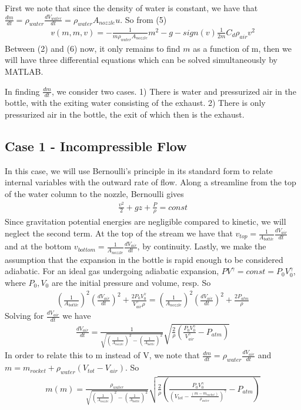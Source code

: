\documentclass[12pt]{article}
\begin{document}
  First we note that since the density of water is constant, we have that $\frac{dm}{dt} = \rho_{water}\frac{dV_{water}}{dt} = \rho_{water}A_{nozzle}u$. So from (5)
  \begin{align}
  v\dot{}(m,m\dot{},v) = -\frac{1}{m\rho_{water}A_{nozzle}}m\dot{}^{2} -g - sign(v)\frac{1}{2m}C_{d}\rho_{air}v^{2}  
  \end{align}
  Between (2) and (6) now, it only remains to find $m\dot{}$ as a function of m, then we will have three differential equations which can be solved simultaneously by MATLAB. 
  
  In finding $\frac{dm}{dt}$, we consider two cases. 1) There is water and pressurized air in the bottle, with the exiting water consisting of the exhaust. 2) There is only pressurized air in the bottle, the exit of which then is the exhaust.
  
  \subsection{Case 1 - Incompressible Flow}
  In this case, we will use Bernoulli's principle in its standard form to relate internal variables with the outward rate of flow. Along a streamline from the top of the water column to the nozzle, Bernoulli gives
  \begin{align}
  \frac{v^{2}}{2} + gz + \frac{P}{\rho} = const
  \end{align}
  Since gravitation potential energies are negligible compared to kinetic, we will neglect the second term. At the top of the stream we have that $v_{top}=\frac{1}{A_{bottle}}\frac{dV_{air}}{dt}$ and at the bottom $v_{bottom}=\frac{1}{A_{nozzle}}\frac{dV_{air}}{dt}$, by continuity. Lastly, we make the assumption that the expansion in the bottle is rapid enough to be considered adiabatic. For an ideal gas undergoing adiabatic expansion, $PV^{\gamma} = const = P_{0}V_{0}^{\gamma}$, where $P_{0}, V_{0}$ are the initial pressure and volume, resp. So
  \begin{align}
  (\frac{1}{A_{bottle}})^{2}(\frac{dV_{air}}{dt})^{2} + \frac{2P_{0}V_{0}^{\gamma}}{V_{air}^{\gamma}\rho} = (\frac{1}{A_{nozzle}})^{2}(\frac{dV_{air}}{dt})^{2} + \frac{2P_{atm}}{\rho}
  \end{align}
  Solving for $\frac{dV_{air}}{dt}$ we have
  \begin{align}
  \frac{dV_{air}}{dt} = \frac{1}{\sqrt{(\frac{1}{A_{nozzle}})^{2} - (\frac{1}{A_{bottle}})^{2}}}\sqrt{\frac{2}{\rho}(\frac{P_{0}V_{0}^{\gamma}}{V_{air}^{\gamma}} - P_{atm})}
  \end{align}
  In order to relate this to m instead of V, we note that $\frac{dm}{dt} = \rho_{water}\frac{dV_{air}}{dt}$ and $m = m_{rocket} + \rho_{water}(V_{tot} - V_{air})$. So
  \begin{align}
  m\dot{}(m) = \frac{\rho_{water}}{\sqrt{(\frac{1}{A_{nozzle}})^{2} - (\frac{1}{A_{bottle}})^{2}}}\sqrt{\frac{2}{\rho}(\frac{P_{0}V_{0}^{\gamma}}{(V_{tot} - \frac{(m - m_{rocket})}{\rho_{water}})^{\gamma}} - P_{atm})}
  \end{align}  
\end{document}
